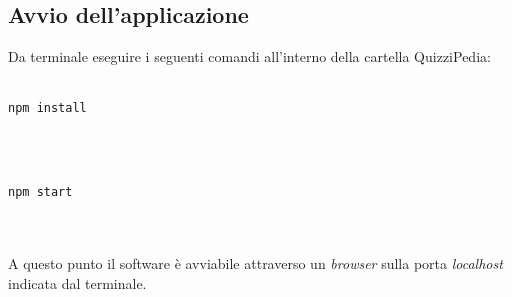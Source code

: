 \subsection{Avvio dell'applicazione}
Da terminale eseguire i seguenti comandi all'interno della cartella QuizziPedia:\\
\\
\centerline{\texttt{npm install}}\\
\\
\centerline{\texttt{npm start}}\\
\\
A questo punto il software è avviabile attraverso un \textit{browser} sulla porta \textit{localhost} indicata dal terminale.